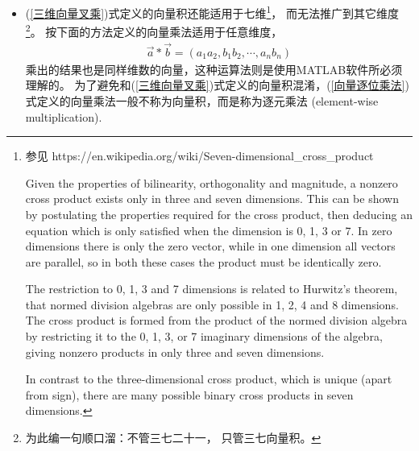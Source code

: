 \begin{itemize}[leftmargin=\inteval{\myitemleftmargin}pt,itemsep=
   \inteval{\myitemitempsep}pt,topsep=\inteval{\myitemtopsep}pt]
\item (\ref{三维向量叉乘})式定义的向量积还能适用于七维\footnote{
参见 https://en.wikipedia.org/wiki/Seven-dimensional\_{}cross\_{}product 

\hspace{4mm} Given the properties of bilinearity, orthogonality and magnitude, a nonzero cross product exists only in three and seven dimensions. This can be shown by postulating the properties required for the cross product, then deducing an equation which is only satisfied when the dimension is 0, 1, 3 or 7. In zero dimensions there is only the zero vector, while in one dimension all vectors are parallel, so in both these cases the product must be identically zero.

\hspace{4mm} The restriction to 0, 1, 3 and 7 dimensions is related to Hurwitz's theorem, that normed division algebras are only possible in 1, 2, 4 and 8 dimensions. The cross product is formed from the product of the normed division algebra by restricting it to the 0, 1, 3, or 7 imaginary dimensions of the algebra, giving nonzero products in only three and seven dimensions. 

\hspace{4mm} In contrast to the three-dimensional cross product, which is unique (apart from sign), there are many possible binary cross products in seven dimensions. }，
而无法推广到其它维度\footnote{为此编一句顺口溜：不管三七二十一，
    只管三七向量积。}。
按下面的方法定义的向量乘法适用于任意维度，
\begin{gather}\label{向量逐位乘法}
    \vec{a}*\vec{b}=(a_1a_2,b_1b_2,\cdots,a_nb_n)
\end{gather}
乘出的结果也是同样维数的向量，这种运算法则是使用MATLAB软件所必须理解的。
为了避免和(\ref{三维向量叉乘})式定义的向量积混淆，(\ref{向量逐位乘法})
式定义的向量乘法一般不称为向量积，而是称为逐元乘法
(element-wise multiplication). 


\end{itemize}
